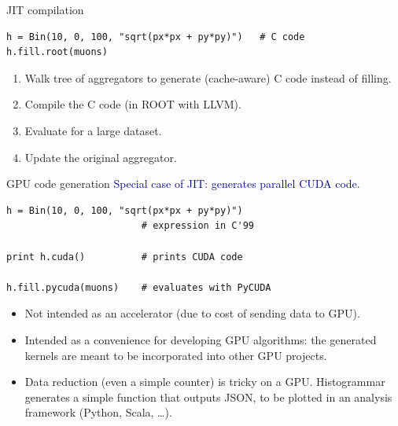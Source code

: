 \documentclass[aspectratio=169]{beamer}
\begin{document}
\begin{frame}[fragile]{JIT compilation}
\begin{verbatim}
h = Bin(10, 0, 100, "sqrt(px*px + py*py)")   # C code
h.fill.root(muons)
\end{verbatim}

\begin{enumerate}\setlength{\itemsep}{0.3 cm}
\item Walk tree of aggregators to generate (cache-aware) C code instead of filling.
\item Compile the C code (in ROOT with LLVM).
\item Evaluate for a large dataset.
\item Update the original aggregator.
\end{enumerate}

\vspace{0.25 cm}
\end{frame}

\begin{frame}[fragile]{GPU code generation}
\vspace{0.5 cm}
\textcolor{darkblue}{\large Special case of JIT: generates parallel CUDA code.}

\begin{center}
\begin{minipage}{0.7\linewidth}
\small
\begin{verbatim}
h = Bin(10, 0, 100, "sqrt(px*px + py*py)")
                        # expression in C'99

print h.cuda()          # prints CUDA code

h.fill.pycuda(muons)    # evaluates with PyCUDA
\end{verbatim}
\end{minipage}
\end{center}

\large
\begin{itemize}
\item<2-> Not intended as an accelerator (due to cost of sending data to GPU).
\item<3-> Intended as a convenience for developing GPU algorithms: the generated kernels are meant to be incorporated into other GPU projects.
\item<4-> Data reduction (even a simple counter) is tricky on a GPU. Histogrammar generates a simple function that outputs JSON, to be plotted in an analysis framework (Python, Scala, \ldots).
\end{itemize}
\end{frame}
\end{document}

